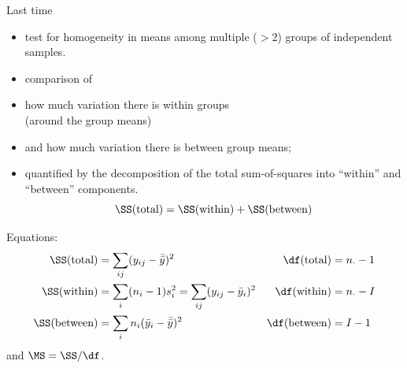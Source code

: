 %
%
%



\subtitle{and two-way ANOVA}

\date{15 April 2015}




\begin{frame}
  \maketitle
\end{frame}



\begin{frame}{Last time}
  \begin{itemize}
    \item {} test for homogeneity in means among multiple ($>2$) groups of independent samples.
    \item {} comparison of 
      \item how much variation there is within groups \\
        (around the group means)
      \item and how much variation there is between group means;
      \item quantified by the decomposition of the total sum-of-squares into ``within'' and ``between'' components.
          \[ 
       \SS(\text{total})  = \SS(\text{within}) + \SS(\text{between})  
   \]
  \end{itemize}

  Equations:
    \begin{align*}
        \SS(\text{total}) &= \sum_{ij} (y_{ij} - \bar {\bar y} )^2 
    &  \df(\text{total}) &= n_\cdot - 1 \\
      \SS(\text{within}) &= \sum_{i} (n_i-1) s_i^2 = \sum_{ij} (y_{ij}-\bar y_i)^2 
   &   \df(\text{within}) &= n_\cdot - I \\
      \SS(\text{between}) &= \sum_{i} n_i (\bar y_i - \bar{\bar y})^2 
      & \df(\text{between}) &= I - 1 \\
    \end{align*}
    and $\MS = \SS / \df$.
    
\end{frame}


